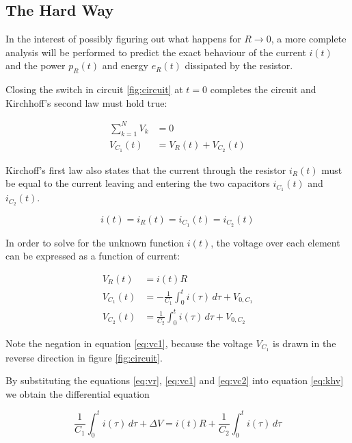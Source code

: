 \subsection{The Hard Way}

In the  interest  of  possibly  figuring out what happens for $R\to 0$, a more
complete  analysis  will  be  performed  to predict the exact behaviour of the
current  $i(t)$ and the power $p_R(t)$ and energy $e_R(t)$ dissipated  by  the
resistor.

Closing the switch in circuit \ref{fig:circuit} at $t=0$ completes the circuit
and Kirchhoff's second law must hold true:

\begin{align}
    \sum_{k=1}^{N} V_k &= 0 \\
    V_{C_1}(t) &= V_R(t) + V_{C_2}(t)
    \label{eq:khv}
\end{align}

Kirchoff's first  law  also  states  that  the  current  through  the resistor
$i_R(t)$ must be equal to the current leaving and entering the  two capacitors
$i_{C_1}(t)$ and $i_{C_2}(t)$.

\begin{equation}
    i(t) = i_R(t) = i_{C_1}(t) = i_{C_2}(t)
    \label{eq:khi}
\end{equation}

In  order to solve for the unknown function  $i(t)$,  the  voltage  over  each
element can be expressed as a function of current:

\begin{align}
    V_R    (t) &= i(t)R \label{eq:vr}\\
    V_{C_1}(t) &= -\frac{1}{C_1}\int_0^t i(\tau)\,d\tau + V_{0,C_1} \label{eq:vc1}\\
    V_{C_2}(t) &= \frac{1}{C_2}\int_0^t i(\tau)\,d\tau + V_{0,C_2} \label{eq:vc2}
\end{align}

Note  the negation in equation \ref{eq:vc1}, because the voltage $V_{C_1}$  is
drawn in the reverse direction in figure \ref{fig:circuit}.

By substituting the equations  \ref{eq:vr}, \ref{eq:vc1} and \ref{eq:vc2} into
equation \ref{eq:khv} we obtain the differential equation

\begin{equation}
    \frac{1}{C_1}\int_0^t i(\tau)\,d\tau + \Delta V = i(t)R + \frac{1}{C_2}\int_0^t i(\tau)\,d\tau
    \label{eq:diff}
\end{equation}

